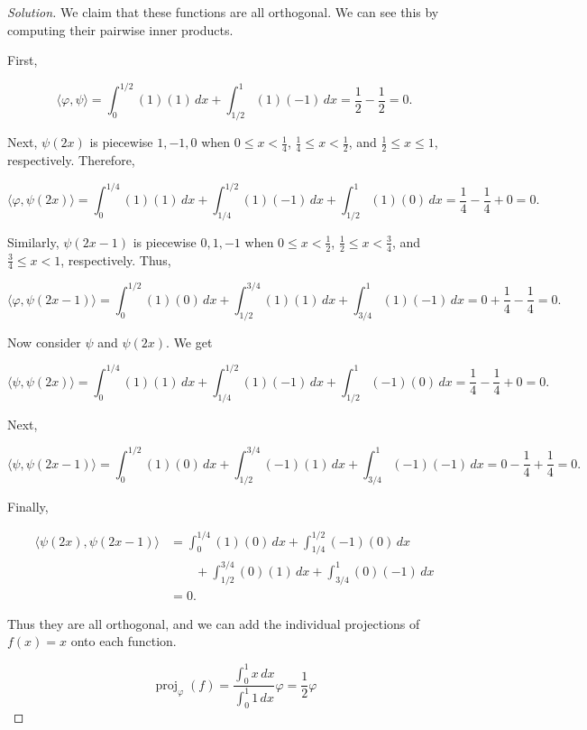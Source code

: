 \documentclass[11pt]{article}
\newcommand{\1}{\mathbf{1}}
\theoremstyle{definition}
\newenvironment{solution}{\begin{proof}[Solution]}{\end{proof}}
\begin{document}
\begin{solution}
We claim that these functions are all orthogonal. We can see this by computing their pairwise inner products.

\par First,

\[
\langle\varphi,\psi\rangle
=
\int_0^{1/2}(1)(1)\,dx
+
\int_{1/2}^1(1)(-1)\,dx
=
\frac12-\frac12
=
0.
\]

\par Next, $\psi(2x)$ is piecewise $1,-1,0$ when $0\le x<\frac14$, $\frac14\le x<\frac12$, and $\frac12\le x\le1$, respectively. Therefore,

\[
\langle\varphi,\psi(2x)\rangle
=
\int_0^{1/4}(1)(1)\,dx
+
\int_{1/4}^{1/2}(1)(-1)\,dx
+
\int_{1/2}^1(1)(0)\,dx
=
\frac14-\frac14+0
=
0.
\]

\par Similarly, $\psi(2x-1)$ is piecewise $0,1,-1$ when $0\le x<\frac12$, $\frac12\le x<\frac34$, and $\frac34\le x<1$, respectively. Thus,

\[
\langle\varphi,\psi(2x-1)\rangle
=
\int_0^{1/2}(1)(0)\,dx
+
\int_{1/2}^{3/4}(1)(1)\,dx
+
\int_{3/4}^1(1)(-1)\,dx
=
0+\frac14-\frac14
=
0.
\]

\par Now consider $\psi$ and $\psi(2x)$. We get

\[
\langle\psi,\psi(2x)\rangle
=
\int_0^{1/4}(1)(1)\,dx
+
\int_{1/4}^{1/2}(1)(-1)\,dx
+
\int_{1/2}^1(-1)(0)\,dx
=
\frac14-\frac14+0
=
0.
\]

\par Next,

\[
\langle\psi,\psi(2x-1)\rangle
=
\int_0^{1/2}(1)(0)\,dx
+
\int_{1/2}^{3/4}(-1)(1)\,dx
+
\int_{3/4}^1(-1)(-1)\,dx
=
0-\frac14+\frac14
=
0.
\]

\par Finally,

\[
\begin{aligned}
\langle\psi(2x),\psi(2x-1)\rangle
&=
\int_0^{1/4}(1)(0)\,dx
+
\int_{1/4}^{1/2}(-1)(0)\,dx\\
&\qquad+
\int_{1/2}^{3/4}(0)(1)\,dx
+
\int_{3/4}^1(0)(-1)\,dx\\
&=
0.
\end{aligned}
\]

\par Thus they are all orthogonal, and we can add the individual projections of $f(x)=x$ onto each function.

\[
\operatorname{proj}_{\varphi}(f)
=
\frac{\int_0^1x\,dx}{\int_0^1 1\,dx}\varphi
=
\frac12\varphi
\]


\end{solution}
\end{document}
